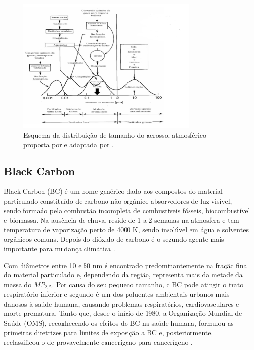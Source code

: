 \begin{figure}[H]
  \centering
  \includegraphics[width=0.8\textwidth]{../inputs/images/modas_aerossol.png}
  \caption{Esquema da distribuição de tamanho do aerossol atmosférico proposta
           por \citet{finlayson1999} e adaptada por \citet{oliveira2007}.
           \label{fig:modas_aerossol}}
\end{figure}

\subsection{Black Carbon}

Black Carbon (BC) é um nome genérico dado aos compostos do material particulado 
constituído de carbono não orgânico absorvedores de luz visível, sendo
formado pela combustão incompleta de combustíveis fósseis, biocombustível e 
biomassa. Na ausência de chuva, reside de 1 a 2 semanas na atmosfera e tem 
temperatura de vaporização perto de 4000 K, sendo insolúvel em água e solventes 
orgânicos comuns. Depois do dióxido de carbono é o segundo agente mais 
importante para mudança climática \citep{bond2013}.

Com diâmetros entre 10 e 50 nm é encontrado predominantemente na fração fina do 
material particulado e, dependendo da região, representa mais da metade 
da massa do $MP_{2,5}$. Por causa do seu pequeno tamanho, o BC pode atingir o 
trato respiratório inferior e segundo \citet{jacobson2014} é um dos poluentes
ambientais urbanos mais danosos à saúde humana, causando problemas 
respiratórios, cardiovasculares e morte prematura. Tanto que, desde o início 
de 1980, a Organização Mundial de Saúde (OMS), reconhecendo os efeitos do BC na 
saúde humana, formulou as primeiras diretrizes para limites de exposição a BC e, 
posteriormente, reclassificou-o de provavelmente cancerígeno para cancerígeno 
\citep{scovronick2015}. 


